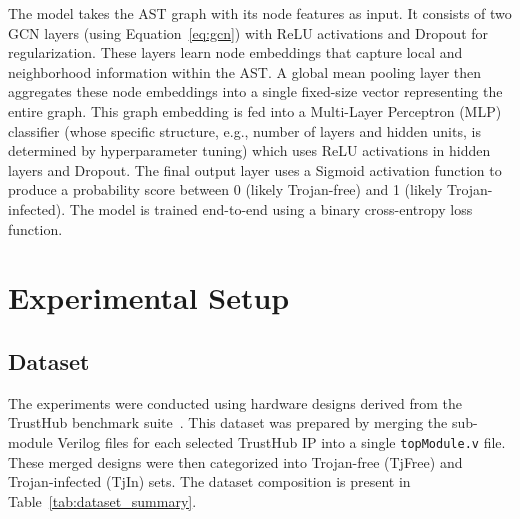 \documentclass[sigplan,screen]{acmart}
\begin{document}
The model takes the AST graph with its node features as input. It consists of two GCN layers (using Equation~\ref{eq:gcn}) with ReLU activations and Dropout for regularization. These layers learn node embeddings that capture local and neighborhood information within the AST. A global mean pooling layer then aggregates these node embeddings into a single fixed-size vector representing the entire graph. This graph embedding is fed into a Multi-Layer Perceptron (MLP) classifier (whose specific structure, e.g., number of layers and hidden units, is determined by hyperparameter tuning) which uses ReLU activations in hidden layers and Dropout. The final output layer uses a Sigmoid activation function to produce a probability score between 0 (likely Trojan-free) and 1 (likely Trojan-infected). The model is trained end-to-end using a binary cross-entropy loss function.

\section{Experimental Setup}
\subsection{Dataset}
The experiments were conducted using hardware designs derived from the TrustHub benchmark suite~\cite{TrustHub}. This dataset was prepared by merging the sub-module Verilog files for each selected TrustHub IP into a single \texttt{topModule.v} file. These merged designs were then categorized into Trojan-free (TjFree) and Trojan-infected (TjIn) sets. The dataset composition is present in Table~\ref{tab:dataset_summary}.
\end{document}
